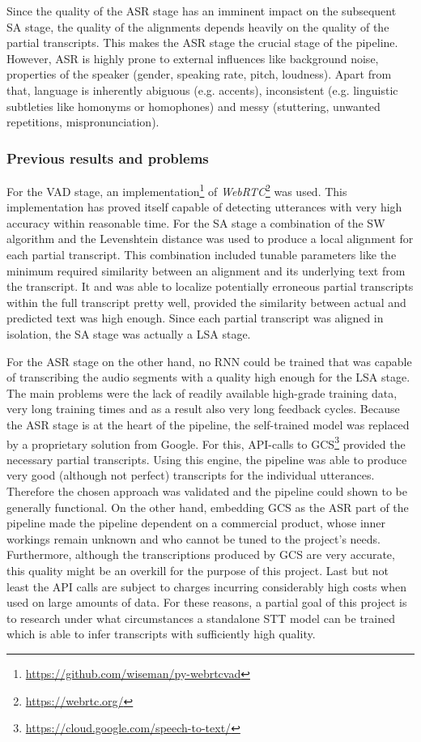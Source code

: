 Since the quality of the \ac{ASR} stage has an imminent impact on the subsequent \ac{SA} stage, the quality of the alignments depends heavily on the quality of the partial transcripts. This makes the \ac{ASR} stage the crucial stage of the pipeline. However, \ac{ASR} is highly prone to external influences like background noise, properties of the speaker (gender, speaking rate, pitch, loudness). Apart from that, language is inherently abiguous (e.g. accents), inconsistent (e.g. linguistic subtleties like homonyms or homophones) and messy (stuttering, unwanted repetitions, mispronunciation).

\subsubsection{Previous results and problems}
For the \ac{VAD} stage, an implementation\footnote{\url{https://github.com/wiseman/py-webrtcvad}} of \textit{WebRTC}\footnote{\url{https://webrtc.org/}} was used. This implementation has proved itself capable of detecting utterances with very high accuracy within reasonable time. For the \ac{SA} stage a combination of the \ac{SW} algorithm and the Levenshtein distance was used to produce a local alignment for each partial transcript. This combination included tunable parameters like the minimum required similarity between an alignment and its underlying text from the transcript. It and was able to localize potentially erroneous partial transcripts within the full transcript pretty well, provided the similarity between actual and predicted text was high enough. Since each partial transcript was aligned in isolation, the \ac{SA} stage was actually a \ac{LSA} stage. 

For the \ac{ASR} stage on the other hand, no \ac{RNN} could be trained that was capable of transcribing the audio segments with a quality high enough for the \ac{LSA} stage. The main problems were the lack of readily available high-grade training data, very long training times and as a result also very long feedback cycles. Because the \ac{ASR} stage is at the heart of the pipeline, the self-trained model was replaced by a proprietary solution from Google. For this, API-calls to \ac{GCS}\footnote{\url{https://cloud.google.com/speech-to-text/}} provided the necessary partial transcripts. Using this engine, the pipeline was able to produce very good (although not perfect) transcripts for the individual utterances. Therefore the chosen approach was validated and the pipeline could shown to be generally functional. On the other hand, embedding \ac{GCS} as the \ac{ASR} part of the pipeline made the pipeline dependent on a commercial product, whose inner workings remain unknown and who cannot be tuned to the project's needs. Furthermore, although the transcriptions produced by \ac{GCS} are very accurate, this quality might be an overkill for the purpose of this project. Last but not least the API calls are subject to charges incurring considerably high costs when used on large amounts of data. For these reasons, a partial goal of this project is to research under what circumstances a standalone \ac{STT} model can be trained which is able to infer transcripts with sufficiently high quality.

